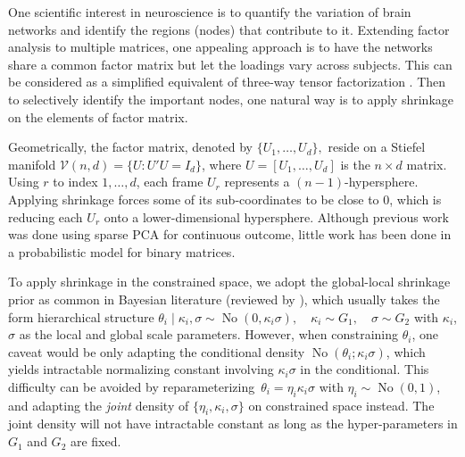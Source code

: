 \documentclass[10pt,fleqn]{article}
\newcommand{\mc}[1]{\mathcal{#1}}
\DeclareMathOperator{\No}{No}
\DeclareMathOperator{\1}{\mathbbm{1}}
\begin{document}
One scientific interest in neuroscience is to quantify the variation of brain networks and identify the  regions
(nodes) that contribute to it. Extending 
factor analysis to multiple matrices, one appealing approach
is to have the networks share a common factor matrix but let the  loadings
vary across subjects. This
can be considered as a simplified equivalent of three-way
tensor factorization \citep{kolda2009tensor}. Then to selectively identify the important nodes, one natural way is to apply shrinkage on the elements
of factor matrix.


Geometrically, the factor matrix, denoted by $\{U_1,\ldots,U_d\},$ reside on a Stiefel manifold $\mc V(n,d)=\{U: U'U=I_d\}$, where $U=[U_1,\ldots,U_d]$ is the $n\times d$ matrix. Using $r$ to index $1,\ldots,d$, each frame $U_r$ represents a $(n-1)$-hypersphere. Applying shrinkage forces some of its sub-coordinates to be close to $0$, which
is  reducing each $U_r$ onto a lower-dimensional hypersphere.
Although previous work was done using sparse PCA \citep{zou2006sparse} for
continuous outcome,  little work has been done in a probabilistic model for
binary matrices.

To apply shrinkage in the constrained space, we adopt the global-local shrinkage prior  as common in Bayesian  literature (reviewed by
\cite{polson2012local}), which usually takes the form hierarchical structure $\theta_i\mid
\kappa_i  ,\sigma\sim \No(0,\kappa_i \sigma), \quad \kappa_i\sim G_1, \quad \sigma \sim G_2$ with
$\kappa_i$, $\sigma$ as the local and global scale parameters.  However,
when constraining $\theta_i$, one caveat would be only adapting the conditional density $\No(\theta_i;\kappa_i \sigma)$, which  yields intractable normalizing constant involving $\kappa_i \sigma$ in the conditional. This difficulty can be avoided by
reparameterizing\ $\theta_i=\eta_i\kappa_i\sigma$ with $\eta_i\sim\No(0,1)$, and adapting the {\it joint} density of $\{\eta_i,\kappa_i,\sigma\}$ on constrained
space instead. The
joint density will not have intractable constant as long as the hyper-parameters in $G_1$ and $G_2$ are fixed.
\end{document}
